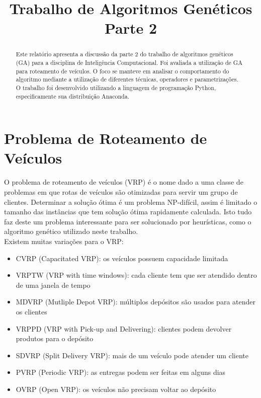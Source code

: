 \documentclass[conference]{IEEEtran}
\begin{document}
\title{Trabalho de Algoritmos Genéticos\\ Parte 2}


\author{
}

\maketitle

\begin{abstract}
Este relatório apresenta a discussão da parte 2  do trabalho de algoritmos
genéticos (GA) para a disciplina de Inteligência Computacional. Foi avaliada a
utilização de GA para roteamento de veículos. O foco se manteve em
analisar o comportamento do algoritmo mediante a utilização de
diferentes técnicas, operadores e parametrizações.\\
O trabalho foi desenvolvido utilizando a linguagem de programação Python,
especificamente sua distribuição Anaconda.\\
\end{abstract}


\section{Problema de Roteamento de Veículos}
O problema de roteamento de veículos (VRP) é o nome dado a uma classe de problemas em que rotas de veículos são otimizadas para servir um grupo de clientes. Determinar a solução ótima é um problema NP-difícil, assim é limitado o tamanho das instâncias que tem solução ótima rapidamente calculada. Isto tudo faz deste um problema interessante para ser solucionado por heurísticas, como o algoritmo genético utilizado neste trabalho.\\

Existem muitas variações para o VRP:
\begin{itemize}
\item CVRP (Capacitated VRP): os veículos possuem capacidade limitada
\item VRPTW (VRP with time windows): cada cliente tem que ser atendido dentro de uma janela de tempo
\item MDVRP (Mutliple Depot VRP): múltiplos depósitos são usados para atender os clientes
\item VRPPD (VRP with Pick-up and Delivering): clientes podem devolver produtos para o depósito
\item SDVRP (Split Delivery VRP): mais de um veículo pode atender um cliente
\item PVRP (Periodic VRP): as entregas podem ser feitas em alguns dias
\item OVRP (Open VRP): os veículos não precisam voltar ao depósito
\end{itemize}
\end{document}
